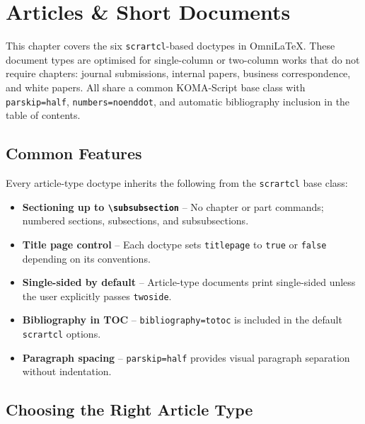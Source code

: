 \chapter{Articles \& Short Documents}
\label{ch:articles}

This chapter covers the six \texttt{scrartcl}-based doctypes in OmniLaTeX.
These document types are optimised for single-column or two-column works that
do not require chapters: journal submissions, internal papers, business
correspondence, and white papers.  All share a common KOMA-Script base class
with \texttt{parskip=half}, \texttt{numbers=noenddot}, and automatic
bibliography inclusion in the table of contents.

\section{Common Features}

Every article-type doctype inherits the following from the
\texttt{scrartcl} base class:

\begin{itemize}
    \item \textbf{Sectioning up to \texttt{\textbackslash subsubsection}} --
          No chapter or part commands; numbered sections, subsections, and
          subsubsections.
    \item \textbf{Title page control} -- Each doctype sets
          \texttt{titlepage} to \texttt{true} or \texttt{false} depending on
          its conventions.
    \item \textbf{Single-sided by default} -- Article-type documents print
          single-sided unless the user explicitly passes \texttt{twoside}.
    \item \textbf{Bibliography in TOC} -- \texttt{bibliography=totoc} is
          included in the default \texttt{scrartcl} options.
    \item \textbf{Paragraph spacing} -- \texttt{parskip=half} provides
          visual paragraph separation without indentation.
\end{itemize}

\section{Choosing the Right Article Type}

